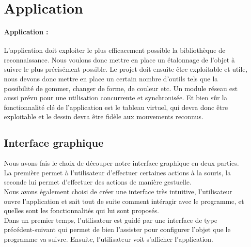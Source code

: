 \documentclass{report}
\begin{document}
		\section{Application}
	\paragraph{Application :\\}
L'application doit exploiter le plus efficacement possible la bibliothèque de reconnaissance. Nous voulons donc mettre en place un étalonnage de l'objet à suivre le plus précisément possible. Le projet doit ensuite être exploitable et utile, nous devons donc mettre en place un certain nombre d'outils tels que la possibilité de gommer, changer de forme, de couleur etc. 
Un module réseau est aussi prévu pour une utilisation concurrente et synchronisée. Et bien sûr la fonctionnalité clé de l'application est le tableau virtuel, qui devra donc être exploitable et le dessin devra être fidèle aux mouvements reconnus.

		\subsection{Interface graphique}
			Nous avons fais le choix de découper notre interface graphique en deux parties. La première permet à l'utilisateur d'effectuer certaines actions à la souris, la seconde lui permet d'effectuer des actions de manière gestuelle. \\
			Nous avons également choisi de créer une interface très intuitive, l'utilisateur ouvre l'application et sait tout de suite comment intéragir avec le programme, et quelles sont les fonctionnalités qui lui sont proposés. \\
			Dans un premier temps, l'utilisateur est guidé par une interface de type précédent-suivant qui permet de bien l'assister pour configurer l'objet que le programme va suivre. Ensuite, l'utilisateur voit s'afficher l'application.
\end{document}

